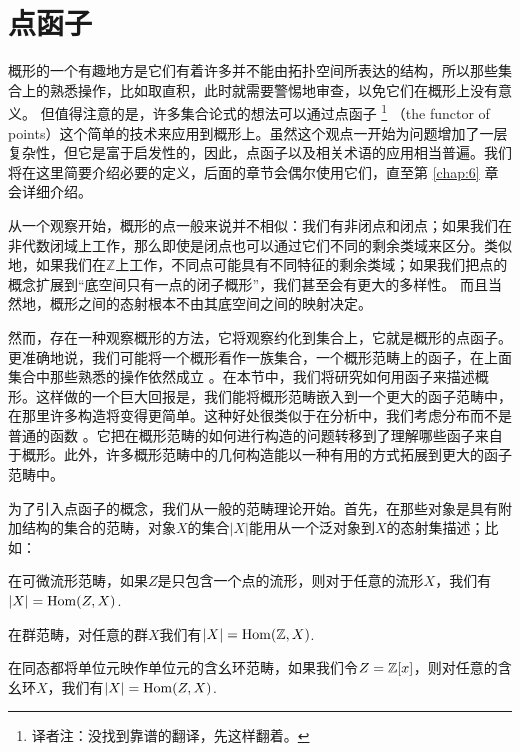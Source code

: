 \section{点函子}\label{s:1.4}

概形的一个有趣地方是它们有着许多并不能由拓扑空间所表达的结构，所以那些集合上的熟悉操作，比如取直积，此时就需要警惕地审查，以免它们在概形上没有意义。 但值得注意的是，许多集合论式的想法可以通过点函子
\footnote{译者注：没找到靠谱的翻译，先这样翻着。}
（the functor of points）这个简单的技术来应用到概形上。虽然这个观点一开始为问题增加了一层复杂性，但它是富于启发性的，因此，点函子以及相关术语的应用相当普遍。我们将在这里简要介绍必要的定义，后面的章节会偶尔使用它们，直至第 \ref{chap:6} 章会详细介绍。

从一个观察开始，概形的点一般来说并不相似：我们有非闭点和闭点；如果我们在非代数闭域上工作，那么即使是闭点也可以通过它们不同的剩余类域来区分。类似地，如果我们在$\mathbb{Z}$上工作，不同点可能具有不同特征的剩余类域；如果我们把点的概念扩展到“底空间只有一点的闭子概形”，我们甚至会有更大的多样性。 而且当然地，概形之间的态射根本不由其底空间之间的映射决定。

然而，存在一种观察概形的方法，它将观察约化到集合上，它就是概形的点函子。更准确地说，我们可能将一个概形看作一族集合，一个概形范畴上的函子，在上面集合中那些熟悉的操作依然成立%
。在本节中，我们将研究如何用函子来描述概形。这样做的一个巨大回报是，我们能将概形范畴嵌入到一个更大的函子范畴中，在那里许多构造将变得更简单。这种好处很类似于在分析中，我们考虑分布而不是普通的函数%
。它把在概形范畴的如何进行构造的问题转移到了理解哪些函子来自于概形。此外，许多概形范畴中的几何构造能以一种有用的方式拓展到更大的函子范畴中。

为了引入点函子的概念，我们从一般的范畴理论开始。首先，在那些对象是具有附加结构的集合的范畴，对象$X$的集合$|X|$能用从一个泛对象到$X$的态射集描述；比如：
\begin{compactenum}[(a)]
\item 在可微流形范畴，如果$Z$是只包含一个点的流形，则对于任意的流形$X$，我们有$|X|=\operatorname{Hom}(Z,X)$.
\item 在群范畴，对任意的群$X$我们有$|X|=\operatorname{Hom}(\mathbb{Z},X)$.
\item 在同态都将单位元映作单位元的含幺环范畴，如果我们令$Z=\mathbb{Z}[x]$，则对任意的含幺环$X$，我们有$|X|=\operatorname{Hom}(Z,X)$.
\end{compactenum}

